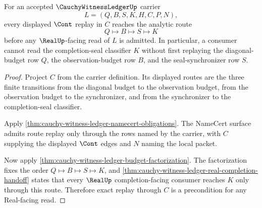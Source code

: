 \begin{theorem}
\label{thm:cauchy-witness-ledger-route-replay-exactness}
For an accepted $\CauchyWitnessLedgerUp$ carrier
$$
L=(Q,B,S,K,H,C,P,N),
$$
every displayed $\Cont$ replay in $C$ reaches the analytic route
$$
Q \longmapsto B \longmapsto S \longmapsto K
$$
before any $\RealUp$-facing read of $L$ is admitted. In particular, a consumer cannot read the completion-seal classifier $K$ without first replaying the diagonal-budget row $Q$, the observation-budget row $B$, and the seal-synchronizer row $S$.
\end{theorem}
\begin{proof}
Project $C$ from the carrier definition. Its displayed routes are the three finite transitions from the diagonal budget to the observation budget, from the observation budget to the synchronizer, and from the synchronizer to the completion-seal classifier.

Apply \autoref{thm:cauchy-witness-ledger-namecert-obligations}. The NameCert surface admits route replay only through the rows named by the carrier, with $C$ supplying the displayed $\Cont$ edges and $N$ naming the local packet.

Now apply \autoref{thm:cauchy-witness-ledger-budget-factorization}. The factorization fixes the order $Q \longmapsto B \longmapsto S \longmapsto K$, and \autoref{thm:cauchy-witness-ledger-real-completion-handoff} states that every $\RealUp$ completion-facing consumer reaches $K$ only through this route. Therefore exact replay through $C$ is a precondition for any Real-facing read.
\end{proof}

